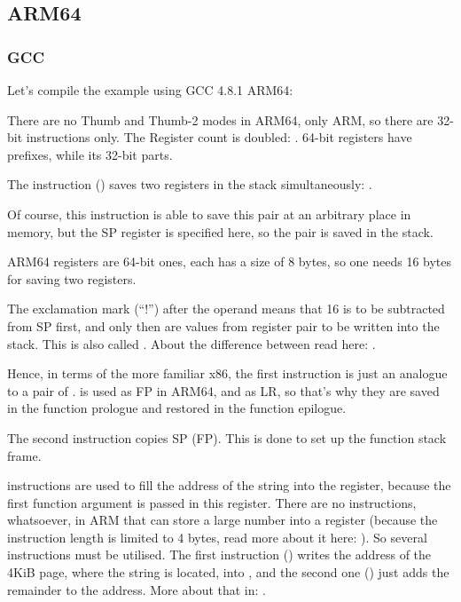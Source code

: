 ﻿\subsection{ARM64}

\subsubsection{GCC}

Let's compile the example using GCC 4.8.1 \InENRU ARM64:



There are no Thumb and Thumb-2 modes in ARM64, only ARM, so there are 32-bit instructions only.
The Register count is doubled: .
64-bit registers have  prefixes, while its 32-bit parts\EMDASH{}.

The  instruction () 
saves two registers in the stack simultaneously:  \InENRU {}.

Of course, this instruction is able to save this pair at an arbitrary place in memory, 
but the \ac{SP} register is specified here, so the pair is saved in the stack.

ARM64 registers are 64-bit ones, each has a size of 8 bytes, so one needs 16 bytes for saving two registers.

The exclamation mark (``!'') after the operand means that 16 is to be subtracted from \ac{SP} first, and only then
are values from register pair to be written into the stack.
This is also called .
About the difference between  \AndENRU {} 
read here: .

Hence, in terms of the more familiar x86, the first instruction is just an analogue to a pair of
 \AndENRU {}.
 is used as \ac{FP} in ARM64, and  
as \ac{LR}, so that's why they are saved in the function prologue and restored in the function epilogue.

The second instruction copies \ac{SP} \InENRU {} (\OrENRU \ac{FP}).
This is done to set up the function stack frame.

\label{pointers_ADRP_and_ADD}
 \AndENRU \ADD instructions are used to fill the 
address of the string  into the  register, 
because the first function argument is passed
in this register.
There are no instructions, whatsoever, in ARM that can store a large number into a register (because the instruction
length is limited to 4 bytes, read more about it here: ).
So several instructions must be utilised.  The first instruction () writes the address of the 4KiB page, where the string is
located, into , 
and the second one (\ADD) just adds the remainder to the address.
More about that in: .


